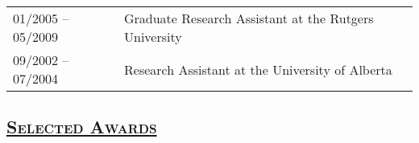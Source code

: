 \documentclass[10pt,twoside,letterpaper]{article}
\newcommand{\tabrowsep}{\vspace{1mm}}
\begin{document}
\begin{tabular}{p{30mm} p{120mm}}
01/2005 -- 05/2009 & Graduate Research Assistant at the Rutgers University \\
09/2002 -- 07/2004 & Research Assistant at the University of Alberta \\
\end{tabular}

\subsection*{\textsc{\underline{Selected Awards}}}
\end{document}
